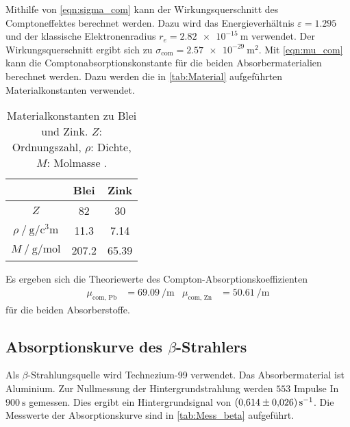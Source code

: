 Mithilfe von \autoref{eqn:sigma_com} kann der Wirkungsquerschnitt des Comptoneffektes berechnet werden. Dazu wird das Energieverhältnis $\varepsilon = 1.295$ und
der klassische Elektronenradius $r_e = \qty{2.82e-15}{\metre}$ \cite{v704} verwendet. Der Wirkungsquerschnitt ergibt sich zu 
$\sigma_\text{com} = \qty{2.57e-29}{\metre^2}$. Mit \autoref{eqn:mu_com} kann die Comptonabsorptionskonstante für die beiden Absorbermaterialien berechnet werden.
Dazu werden die in \autoref{tab:Material} aufgeführten Materialkonstanten verwendet.

\begin{table}[H]
  \centering
  \caption{Materialkonstanten zu Blei und Zink. $Z$: Ordnungszahl, $\rho$: Dichte, $M$: Molmasse \cite{Gestis}.}
  \label{tab:Material}
  \begin{tabular}{c c c}
    \toprule
      {} & {Blei} & {Zink} \\
      \midrule
      {$Z$}                                                    & 82    & 30    \\
      {$\rho \mathbin{/} \unit{\gram\per\cubic\centi\metre}$} & 11.3  & 7.14  \\
      {$M \mathbin{/} \unit{\gram\per\mol}$}                  & 207.2 & 65.39 \\
    \bottomrule
  \end{tabular}
\end{table}

Es ergeben sich die Theoriewerte des Compton-Absorptionskoeffizienten 
\begin{align*}
  \mu_\text{com, Pb} &= \qty{69.09}{\per\metre} & \mu_\text{com, Zn} &= \qty{50.61}{\per\metre}
\end{align*}
für die beiden Absorberstoffe.

\subsection{\texorpdfstring{Absorptionskurve des $\beta$-Strahlers}{Absorptionskurve des Beta-Strahlers}}
\label{subsec:A_beta}
Als $\beta$-Strahlungsquelle wird Technezium-99 verwendet. Das Absorbermaterial ist Aluminium. Zur Nullmessung der Hintergrundstrahlung werden $553$ Impulse In
$\qty{900}{\second}$ gemessen. Dies ergibt ein Hintergrundsignal von $\qty{ 0.614+-0.026}{\second^{-1}}$. Die Messwerte der Absorptionskurve sind in 
\autoref{tab:Mess_beta} aufgeführt.

